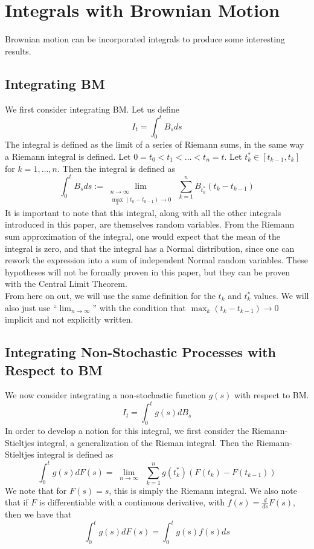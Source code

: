 \documentclass{article}
\begin{document}
\section{Integrals with Brownian Motion}
Brownian motion can be incorporated integrals to produce some interesting results.


\subsection{Integrating BM}
We first consider integrating BM.  Let us define 
$$I_t = \int_0^t B_s ds$$
The integral is defined as the limit of a series of Riemann sums, in the same way a Riemann integral is defined.  Let $0=t_0 < t_1 < \ldots < t_n = t$.  Let $t_k^* \in [t_{k-1},t_k]$ for $k=1,\ldots,n$.  Then the integral is defined as
$$\int_0^t B_s ds := 
\lim_{\substack{n\to\infty \\ \max_k(t_k-t_{k-1})\to0}}\ 
\sum_{k=1}^nB_{t_k^*}(t_k-t_{k-1})$$
It is important to note that this integral, along with all the other integrals introduced in this paper, are themselves random variables.  From the Riemann sum approximation of the integral, one would expect that the mean of the integral is zero, and that the integral has a Normal distribution, since one can rework the expression into a sum of independent Normal random variables.  These hypotheses will not be formally proven in this paper, but they can be proven with the Central Limit Theorem.
\\

From here on out, we will use the same definition for the $t_k$ and $t_k^*$ values.  We will also just use ``$\lim_{n\to\infty}$'' with the condition that $\max_k(t_k-t_{k-1})\to 0$ implicit and not explicitly written.




\subsection{Integrating Non-Stochastic Processes with Respect to BM}
We now consider integrating a non-stochastic function $g(s)$ with respect to BM. 
$$I_t = \int_0^t g(s) dB_s$$
In order to develop a notion for this integral, we first consider the Riemann-Stieltjes integral, a generalization of the Rieman integral.  %
Then the Riemann-Stieltjes integral is defined as 
$$\int_0^t g(s)dF(s) = 
\lim_{\substack{n\to\infty}}\ 
\sum_{k=1}^n g(t_k^*)(F(t_k) - F(t_{k-1}))$$ 
We note that for $F(s) = s$, this is simply the Riemann integral.  We also note that if $F$ is differentiable with a continuous derivative, with $f(s) = \frac{d}{ds}F(s)$, then we have that 
$$\int_0^t g(s)dF(s) = \int_0^t g(s)f(s)ds$$
\end{document}
